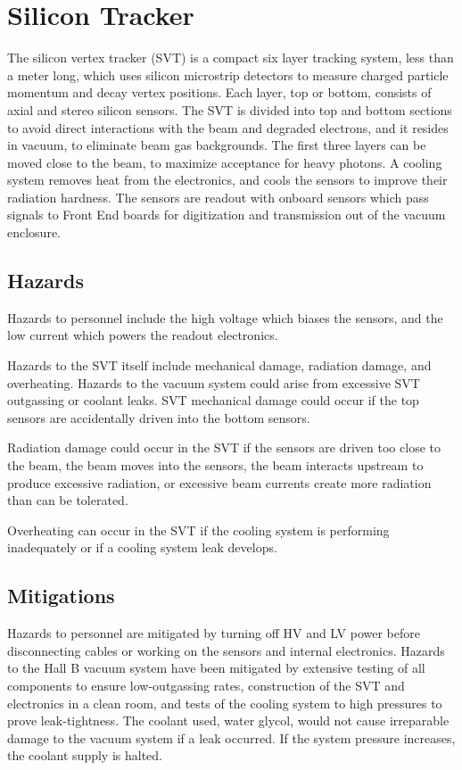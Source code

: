 
\section{Silicon Tracker}
\indent

The silicon vertex tracker (SVT) is a compact six layer tracking system, less than a meter long, which uses silicon microstrip detectors to measure charged particle momentum and decay vertex positions. Each layer, top or bottom, consists of axial and stereo silicon sensors. The SVT  is divided into top and bottom sections  to avoid direct interactions with the beam and degraded electrons, and it resides in vacuum, to eliminate beam gas backgrounds. The first three layers can be moved close to the beam, to maximize acceptance for heavy photons. A cooling system removes heat from the electronics, and cools the sensors to improve their radiation hardness.  The sensors are readout with onboard sensors which pass signals to Front End boards for digitization and transmission out of the vacuum enclosure.

\subsection{Hazards} 
\indent

Hazards to personnel include the high voltage which biases the sensors, and the low current which powers the readout electronics.

Hazards to the SVT itself include mechanical damage, radiation damage, and overheating. Hazards to the vacuum system could arise from excessive SVT outgassing or coolant leaks.
SVT mechanical damage could occur if the top sensors are accidentally driven into the bottom sensors.

Radiation damage could occur in the SVT  if the sensors are driven too close to the beam, the beam moves into the sensors, the beam interacts upstream to produce excessive radiation, or excessive beam currents create more radiation than can be tolerated.

Overheating can occur in the SVT  if the cooling system is performing inadequately or if a cooling system leak develops.

\subsection{Mitigations}
\indent

Hazards to personnel are mitigated by turning off HV and LV power before disconnecting cables or working on the sensors and internal electronics.
Hazards to the Hall B vacuum system have been mitigated by extensive testing of all components to ensure low-outgassing rates, construction of the SVT and electronics in a clean room, and tests of the cooling system to high pressures to prove leak-tightness. The coolant used, water glycol, would not cause irreparable damage to the vacuum system if a leak occurred. If the system pressure  increases, the coolant supply is halted.

